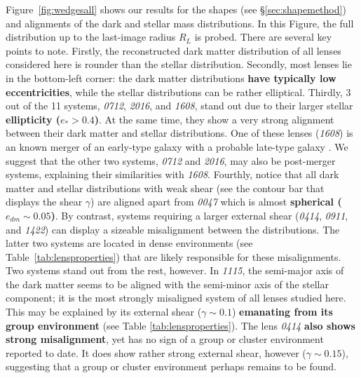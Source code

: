 \documentclass[useAMS,usenatbib]{mn2e}
\newcommand{\cb}[1]{{\color{red} \textbf{#1}}}
\begin{document}
Figure~\ref{fig:wedgesall} shows our results for the shapes (see \S\ref{sec:shapemethod}) and alignments of the dark and stellar mass distributions. In this Figure, the full distribution up to the last-image radius $R_{L}$ is probed. There are several key points to note. Firstly, the reconstructed dark matter distribution of all lenses considered here is rounder than the stellar distribution. Secondly, most lenses lie in the bottom-left corner: the dark matter distributions \cb{have typically low eccentricities}, while the stellar distributions can be rather elliptical. Thirdly, 3 out of the 11 systems, {\it0712}, {\it2016}, and {\it1608}, stand out due to their larger stellar \cb{ellipticity ($e_* > 0.4$)}. At the same time, they show a very strong alignment between their dark matter and stellar distributions. One of these lenses ({\it1608}) is an known merger of an early-type galaxy with a probable late-type galaxy \citep{2003ApJ...584..100S}. We suggest that the other two systems, {\it0712} and {\it2016}, may also be post-merger systems, explaining their similarities with {\it1608}. Fourthly, notice that all dark matter and stellar distributions with weak shear (see the contour bar that displays the shear $\gamma$) are aligned apart from {\it0047} which is almost \cb{spherical ($e_{dm}\sim0.05$)}. By contrast, systems requiring a larger external shear ({\it0414}, {\it0911}, and {\it1422}) can display a sizeable misalignment between the distributions. The latter two systems are located in dense environments (see Table~\ref{tab:lensproperties}) that are likely responsible for these misalignments. Two systems stand out from the rest, however. In {\it1115}, the semi-major axis of the dark matter seems to be aligned with the semi-minor axis of the stellar component; it is the most strongly misaligned system of all lenses studied here. This may be explained by its external shear ($\gamma \sim 0.1$) \cb{emanating from its group environment} (see Table \ref{tab:lensproperties}). The lens {\it0414} \cb{also shows strong misalignment}, yet has no sign of a group or cluster environment reported to date. It does show rather strong external shear, however ($\gamma \sim 0.15$), suggesting that a group or cluster environment perhaps remains to be found.
\end{document}
